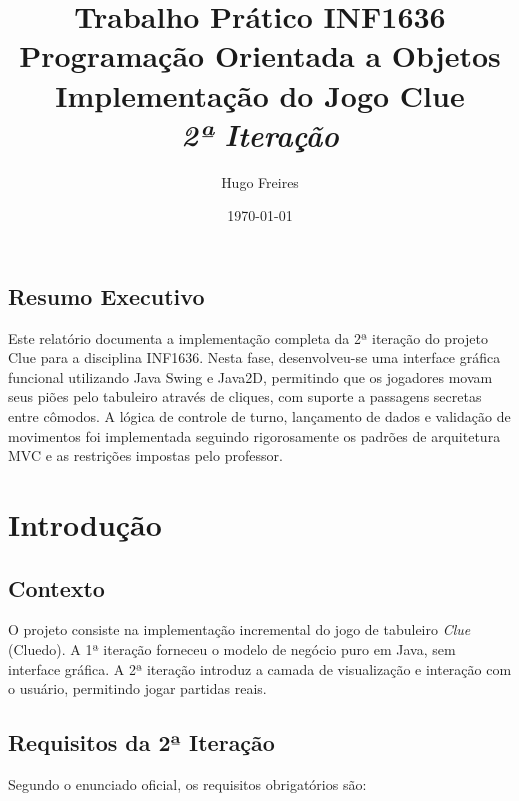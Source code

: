 \documentclass[12pt,a4paper]{report}
\title{\Large \textbf{Trabalho Prático INF1636 \\ Programação Orientada a Objetos} \\[0.5cm]
\textbf{Implementação do Jogo Clue} \\[0.3cm]
\textit{2ª Iteração}}
\author{Hugo Freires}
\date{\today}
\begin{document}
\maketitle

\section*{Resumo Executivo}

Este relatório documenta a implementação completa da 2ª iteração do projeto Clue para a disciplina INF1636. Nesta fase, desenvolveu-se uma interface gráfica funcional utilizando Java Swing e Java2D, permitindo que os jogadores movam seus piões pelo tabuleiro através de cliques, com suporte a passagens secretas entre cômodos. A lógica de controle de turno, lançamento de dados e validação de movimentos foi implementada seguindo rigorosamente os padrões de arquitetura MVC e as restrições impostas pelo professor.

\tableofcontents

\chapter{Introdução}

\section{Contexto}

O projeto consiste na implementação incremental do jogo de tabuleiro \textit{Clue} (Cluedo). A 1ª iteração forneceu o modelo de negócio puro em Java, sem interface gráfica. A 2ª iteração introduz a camada de visualização e interação com o usuário, permitindo jogar partidas reais.

\section{Requisitos da 2ª Iteração}

Segundo o enunciado oficial, os requisitos obrigatórios são:
\end{document}
